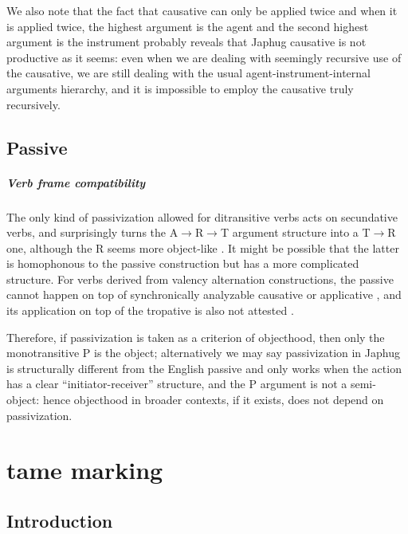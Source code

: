 \documentclass[a4paper, oneside, 12pt]{report}
\newcommand*{\textto}{$\to$}
\newcommand*{\citesec}[1]{\S~{#1}}
\newcommand*{\citepage}[1]{p.~{#1}}
\begin{document}
We also note that the fact that causative can only be applied twice and
when it is applied twice, the highest argument is the agent
and the second highest argument is the instrument
probably reveals that Japhug causative is not productive as it seems:
even when we are dealing with seemingly recursive use of the causative,
we are still dealing with the usual agent-instrument-internal arguments hierarchy,
and it is impossible to employ the causative truly recursively.

\section{Passive}

\paragraph*{Verb frame compatibility}\label{sec:voice.passive.input}
The only kind of passivization allowed for ditransitive verbs
acts on secundative verbs,
and surprisingly turns the A\textto R\textto T argument structure
into a T\textto R one, although the R seems more object-like
\citep[\citepage{884}]{jacques2021grammar}.
It might be possible that the latter is homophonous to the passive construction
but has a more complicated structure.
For verbs derived from valency alternation constructions,
the passive cannot happen on top of synchronically analyzable causative or applicative 
\citep[\citepage{885}]{jacques2021grammar},
and its application on top of the tropative is also not attested
\citep[\citesec{17.5.4}]{jacques2021grammar}.

Therefore, if passivization is taken as a criterion of objecthood,
then only the monotransitive P is the object;
alternatively we may say passivization in Japhug
is structurally different from the English passive
and only works when the action has a clear ``initiator-receiver'' structure,
and the P argument is not a semi-object:
hence objecthood in broader contexts, if it exists,
does not depend on passivization.

\chapter{\acs{tame} marking}

\section{Introduction}
\end{document}
